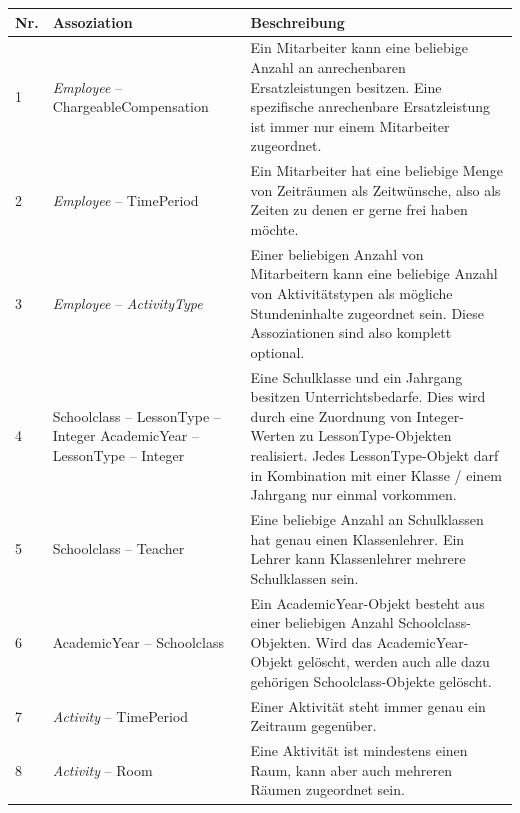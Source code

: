 \documentclass[fontsize=12pt,paper=a4,twoside]{scrartcl}
\begin{document}
\begin{tabularx}{\textwidth}{|p{0.6cm}|p{5cm}|X|}
\hline
\textbf{Nr.} & \textbf{Assoziation} & \textbf{Beschreibung} \\\hline
1 	& \textit{Employee} -- ChargeableCompensation	& Ein Mitarbeiter kann eine beliebige Anzahl
	an anrechenbaren Ersatzleistungen besitzen. Eine spezifische anrechenbare Ersatzleistung ist immer nur einem Mitarbeiter zugeordnet. \\\hline
2	& \textit{Employee} -- TimePeriod		& Ein Mitarbeiter hat eine beliebige Menge von 
	Zeiträumen als Zeitwünsche, also als Zeiten zu denen er gerne frei haben möchte. \\\hline
3	& \textit{Employee} -- \textit{ActivityType} & Einer beliebigen Anzahl von Mitarbeitern kann
	eine beliebige Anzahl von Aktivitätstypen als mögliche Stundeninhalte zugeordnet sein. Diese Assoziationen sind also komplett optional. \\\hline
4	& Schoolclass -- LessonType -- Integer \newline
	  AcademicYear -- LessonType -- Integer				& Eine Schulklasse und ein Jahrgang besitzen Unterrichtsbedarfe. Dies wird durch eine Zuordnung von Integer-Werten zu LessonType-Objekten realisiert. Jedes LessonType-Objekt darf in Kombination mit einer Klasse / einem Jahrgang nur einmal vorkommen. \\\hline
5	& Schoolclass -- Teacher 				& Eine beliebige Anzahl an Schulklassen hat genau
	einen Klassenlehrer. Ein Lehrer kann Klassenlehrer mehrere Schulklassen sein. \\\hline
6	& AcademicYear -- Schoolclass 			& Ein AcademicYear-Objekt besteht aus einer beliebigen 
	Anzahl Schoolclass-Objekten. Wird das AcademicYear-Objekt gelöscht, werden auch alle dazu gehörigen Schoolclass-Objekte gelöscht.\\\hline
7	& \textit{Activity} -- TimePeriod				& Einer Aktivität steht immer genau ein
	Zeitraum gegenüber.\\\hline
8	& \textit{Activity} -- Room						& Eine Aktivität ist mindestens einen Raum, 
	kann aber auch mehreren Räumen zugeordnet sein.\\\hline
\end{tabularx}
\end{document}
